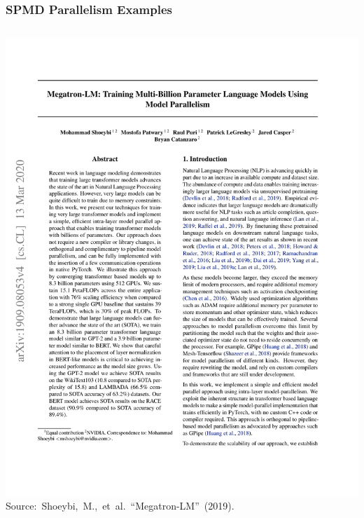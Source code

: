 \documentclass[12pt,aspectratio=169]{beamer}
\begin{document}
    \begin{frame}
        \frametitle{SPMD Parallelism Examples}

        \begin{columns}
            \begin{column}{0.5\textwidth}
                \centering
                \includegraphics[page=4,trim=10.9cm 17.5cm 1.9cm 2.2cm,clip,scale=0.75]{megatron.pdf}
                \hbox{\tiny Source: Shoeybi, M., et al.~``Megatron-LM'' (2019).}
            \end{column}
\end{columns}
\end{frame}
\end{document}
